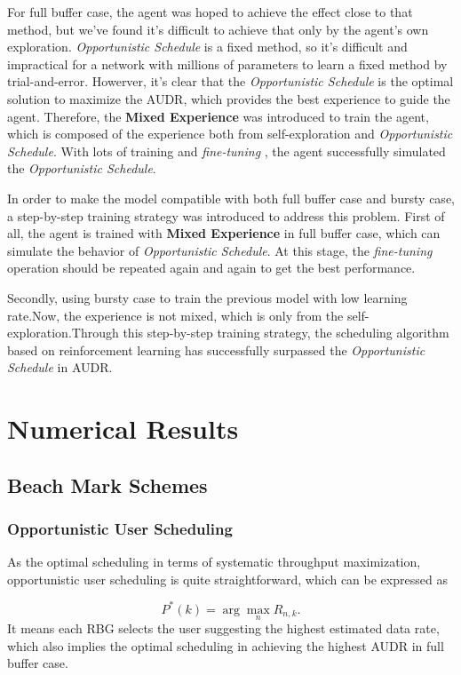\documentclass[conference,compsocconf]{IEEEtran}
\begin{document}
For full buffer case, the agent was hoped to achieve the effect close to that method, 
but we've found it's difficult to achieve that only by the agent's own exploration.
\textit{Opportunistic Schedule} is a fixed method, 
so it's difficult and impractical for a network with millions of parameters to learn a fixed method by trial-and-error.
Howerver, it's clear that the \textit{Opportunistic Schedule} is the optimal solution to maximize the AUDR, 
which provides the best experience to guide the agent.
Therefore, the \textbf{Mixed Experience} was introduced to train the agent, which is composed of the experience both from self-exploration and \textit{Opportunistic Schedule}.
With lots of training and \textit{fine-tuning} \cite{HowardUniversal}, the agent successfully simulated the \textit{Opportunistic Schedule}.

In order to make the model compatible with both full buffer case and bursty case, a step-by-step training strategy was introduced to address this problem.
First of all, the agent is trained with \textbf{Mixed Experience} in full buffer case, which can simulate the behavior of \textit{Opportunistic Schedule}.
At this stage, the \textit{fine-tuning} operation should be repeated again and again to get the best performance.

Secondly, using bursty case to train the previous model with low learning rate.Now, the experience is not mixed, which is only from the self-exploration.Through this step-by-step training strategy, the scheduling algorithm based on reinforcement learning has successfully surpassed the \textit{Opportunistic Schedule} in AUDR.

\section{Numerical Results}

\subsection{Beach Mark Schemes}
\subsubsection{Opportunistic User Scheduling} As the optimal scheduling in terms of systematic throughput maximization, opportunistic user scheduling is quite straightforward, which can be expressed as

\begin{equation}
P^*(k)=\arg\mathop{\max}_{n}R_{n,k}.
\end{equation} 
It means each RBG selects the user suggesting the highest estimated data rate, which also implies the optimal scheduling in achieving the highest AUDR in full buffer case.
\end{document}
